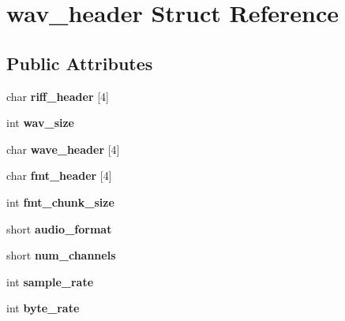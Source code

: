 \hypertarget{structwav__header}{}\section{wav\+\_\+header Struct Reference}
\label{structwav__header}
\subsection*{Public Attributes}
\begin{DoxyCompactItemize}
\item 
\mbox{\label{structwav__header_a977b8193bf1f39dbd815c6210f0bb6c6}} 
char {\bfseries riff\+\_\+header} \mbox{[}4\mbox{]}
\item 
\mbox{\label{structwav__header_a89a86a26a94e726411e34517bfc9105e}} 
int {\bfseries wav\+\_\+size}
\item 
\mbox{\label{structwav__header_a0dc0cff34ad7fe5e59c5cbcee1640354}} 
char {\bfseries wave\+\_\+header} \mbox{[}4\mbox{]}
\item 
\mbox{\label{structwav__header_a4039d1e8e91d7940aa45a29aad27b4ce}} 
char {\bfseries fmt\+\_\+header} \mbox{[}4\mbox{]}
\item 
\mbox{\label{structwav__header_a5fb4363d52bbff51ca2e8884408208c6}} 
int {\bfseries fmt\+\_\+chunk\+\_\+size}
\item 
\mbox{\label{structwav__header_a94c9ee0387f846c47eb9e97636994d93}} 
short {\bfseries audio\+\_\+format}
\item 
\mbox{\label{structwav__header_a625d84de0f598e50c072d725f6e3b6b8}} 
short {\bfseries num\+\_\+channels}
\item 
\mbox{\label{structwav__header_a0632019c676aa88f0351c0ab11461de0}} 
int {\bfseries sample\+\_\+rate}
\item 
\mbox{\label{structwav__header_a8330740d45200d6aee4ba54fc0d834d8}} 
int {\bfseries byte\+\_\+rate}
\item 
\mbox{\label{structwav__header_a2672b73c81973008677db6349fbc232a}} 

\end{DoxyCompactItemize}
